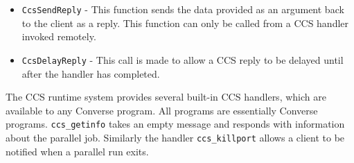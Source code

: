 \documentclass[10pt]{article}
\begin{document}
\begin{itemize}

\item

\texttt{CcsSendReply} - This function sends the data provided as
an argument back to the client as a reply. This function can only
be called from a CCS handler invoked remotely.

\item

\texttt{CcsDelayReply} - This call is made to allow a CCS reply to
be delayed until after the handler has completed.


\end{itemize}

The CCS runtime system provides several built-in CCS handlers,
which are available to any Converse program. All \charmpp{}
programs are essentially Converse programs. \texttt{ccs\_getinfo}
takes an empty message and responds with information about the
parallel job. Similarly the handler \texttt{ccs\_killport} allows
a client to be notified when a parallel run exits.
\end{document}
